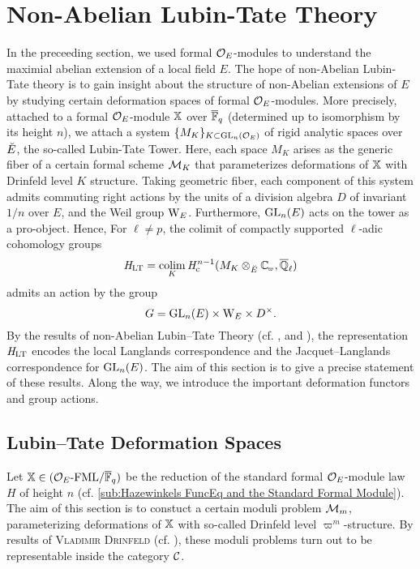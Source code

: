 \documentclass[../main.tex]{subfiles}
\begin{document}
\section{Non-Abelian Lubin-Tate Theory} %
\label{sec:Non-Abelian Lubin-Tate Theory: An Overview}
In the preceeding section, we used formal $\mathcal{O}_E$-modules to understand the 
maximial abelian extension of a local field $E$. The hope of non-Abelian Lubin-Tate
theory is to gain insight about the structure of non-Abelian extensions of $E$
by studying certain deformation spaces of formal $\mathcal{O}_E$-modules.
More precisely, attached to a formal $\mathcal{O}_E$-module $\mathbb{X}$ over ${\overline {\mathbb{F}}_q}$
(determined
up to isomorphism by its height $n$), we attach a system 
$\{M_K\}_{K \subset \operatorname{GL}_n(\mathcal{O}_E)}$ of rigid analytic spaces
over ${\breve {E}}$, the so-called Lubin-Tate Tower. Here, each
space $M_K$ arises as the generic fiber of a certain
formal scheme $\mathcal{M}_K$ that parameterizes deformations of
$\mathbb{X}$ with Drinfeld level $K$ structure.
Taking geometric fiber, each component of this system admits
commuting right actions by the units of a division algebra $D$
of invariant $1/n$ over $E$, and the Weil group
$\mathrm W_E$. Furthermore, $\operatorname{GL}_n(E)$ acts on the tower
as a pro-object.
Hence, For $\ell \neq p$, 
the colimit of compactly supported $\ell$-adic  cohomology groups 
$$\HLT = \colim_K \hHc^{n-1}(M_K \otimes_{\br E} \Cp,
\bar \Q_\ell)$$ admits an action by the group
$$G = \operatorname{GL}_n(E) \times \mathrm W_E \times D^\times.$$
By the results of non-Abelian Lubin--Tate Theory (cf. \cite{HTShimura}, \cite{mieda2010NonCusp} and \cite{boyer1999mauvaise}),
the representation $\mathit H_{\mathrm{LT}}$ encodes
the local Langlands correspondence and the Jacquet--Langlands correspondence for $\operatorname{GL}_n(E)$. 
The aim of this section
is to give a precise statement of these results. Along
the way, we introduce the important deformation functors
and group actions. 

\subsection{Lubin--Tate Deformation Spaces} %
\label{sub:Lubin-Tate Deformation Spaces}
Let $\mathbb{X} \in {({\mathcal{O}_E}\textnormal-\allowbreak\mathrm{FML}/{{\overline{\mathbb{F}}_q}})}$ be the reduction of the standard formal
$\mathcal{O}_E$-module law $H$ of height $n$ (cf. \cref{sub:Hazewinkels FuncEq and the
Standard Formal Module}).
The aim of this section is to constuct a certain moduli problem $\mathcal{M}_{m}$,
parameterizing deformations of $\mathbb{X}$ with so-called Drinfeld level $\varpi^m$-structure.
By results of \textsc{Vladimir Drinfeld} (cf. \cite{drinfel1974elliptic}),
these moduli problems turn out to be representable inside the category $\mathcal{C}$.
\end{document}
